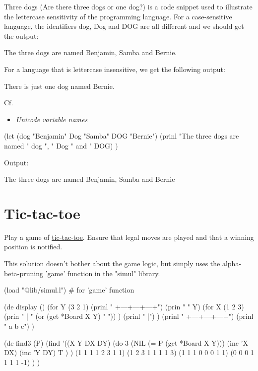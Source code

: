 Three dogs (Are there three dogs or one dog?) is a code snippet used to
illustrate the lettercase sensitivity of the programming language. For a
case-sensitive language, the identifiers dog, Dog and DOG are all
different and we should get the output:

The three dogs are named Benjamin, Samba and Bernie.

For a language that is lettercase insensitive, we get the following
output:

There is just one dog named Bernie.

\begin{description}
\item[Cf.]
\end{description}

\begin{itemize}
\item \emph{Unicode variable names}
\end{itemize}


\begin{wideverbatim}

(let (dog "Benjamin"  Dog "Samba"  DOG "Bernie")
   (prinl "The three dogs are named " dog ", " Dog " and " DOG) )

Output:

The three dogs are named Benjamin, Samba and Bernie

\end{wideverbatim}

\pagebreak{}
\section*{Tic-tac-toe}

Play a game of
\href{http://en.wikipedia.org/wiki/Tic-tac-toe}{tic-tac-toe}. Ensure
that legal moves are played and that a winning position is notified.

\begin{wideverbatim}

This solution doesn't bother about the game logic, but simply uses
the alpha-beta-pruning 'game' function in the "simul" library.

(load "@lib/simul.l")  # for 'game' function
 
(de display ()
   (for Y (3 2 1)
      (prinl "   +---+---+---+")
      (prin " " Y)
      (for X (1 2 3)
         (prin " | " (or (get *Board X Y) " ")) )
      (prinl " |") )
   (prinl "   +---+---+---+")
   (prinl "     a   b   c") )
 
(de find3 (P)
   (find
      '((X Y DX DY)
         (do 3
            (NIL (= P (get *Board X Y)))
            (inc 'X DX)
            (inc 'Y DY)
            T ) )
      (1 1 1 1 2 3 1 1)
      (1 2 3 1 1 1 1 3)
      (1 1 1 0 0 0 1 1)
      (0 0 0 1 1 1 1 -1) ) )
 
\end{wideverbatim}

